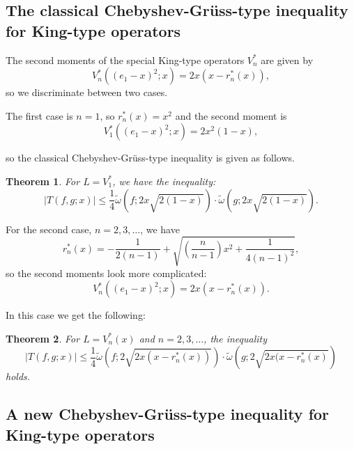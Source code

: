 \documentclass[12pt,leqno,a4paper,dvips,twoside]{article}
\newtheorem{thm}{Theorem}[section]
\begin{document}
{\subsection{The classical Chebyshev-Gr\"{u}ss-type inequality for King-type operators}

The second moments of the special King-type operators $V^{*}_{n}$ are given by
	\begin{equation*}
		V^*_n((e_1-x)^2;x)=2x(x-r^*_n(x)),
	\end{equation*}
so we discriminate between two cases. 

The first case is $n=1$, so $r^*_n(x)=x^2$ and the second moment is
	\begin{equation*}
		V^*_1((e_1-x)^2;x)=2x^2(1-x),
	\end{equation*}

so the classical Chebyshev-Gr\"{u}ss-type inequality is given as follows. 

\begin{thm}
	For $L=V^*_1$, we have the inequality:
		\begin{equation*}
	\left|T(f,g;x)\right|\leq \frac{1}{4}\widetilde{\omega}\left(f;2x\sqrt{2(1-x)}\right)\cdot \widetilde{\omega}\left(g;2x\sqrt{2(1-x)}\right).
	\end{equation*}
\end{thm}

For the second case, $n=2,3,\ldots$, we have
	\begin{equation*}
		r^*_n(x)=-\frac{1}{2(n-1)}+\sqrt{\left(\frac{n}{n-1}\right)x^2+\frac{1}{4(n-1)^2}},
	\end{equation*}
so the second moments look more complicated:
	\begin{equation*}
		V^*_n((e_1-x)^2;x)=2x(x-r^*_n(x)).
	\end{equation*}

In this case we get the following:

\begin{thm}
	For $L=V^*_n(x)$ and $n=2,3,\ldots$, the inequality
		\begin{equation*}
		\left|T(f,g;x)\right|\leq \frac{1}{4}\widetilde{\omega}\left(f;2\sqrt{2x(x-r^*_n(x))}\right)\cdot \widetilde{\omega}\left(g;2\sqrt{2x(x-r^*_n(x)}\right)
		\end{equation*}
	holds.
\end{thm}

\subsection{A new Chebyshev-Gr\"{u}ss-type inequality for King-type operators}

}
\end{document}

